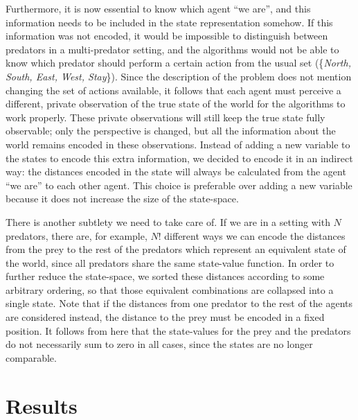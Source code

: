 \documentclass[a4paper,12pt]{article}
\begin{document}
Furthermore, it is now essential to know which agent ``we are'', and this information needs to be included in the state representation somehow. If this information was not encoded, it would be impossible to distinguish between predators in a multi-predator setting, and the algorithms would not be able to know which predator should perform a certain action from the usual set (\{\textit{North, South, East, West, Stay}\}). Since the description of the problem does not mention changing the set of actions available, it follows that each agent must perceive a different, private observation of the true state of the world for the algorithms to work properly. These private observations will still keep the true state fully observable; only the perspective is changed, but all the information about the world remains encoded in these observations. Instead of adding a new variable to the states to encode this extra information, we decided to encode it in an indirect way: the distances encoded in the state will always be calculated from the agent ``we are'' to each other agent. This choice is preferable over adding a new variable because it does not increase the size of the state-space.

There is another subtlety we need to take care of. If we are in a setting with $N$ predators, there are, for example, $N!$ different ways we can encode the distances from the prey to the rest of the predators which represent an equivalent state of the world, since all predators share the same state-value function. In order to further reduce the state-space, we sorted these distances according to some arbitrary ordering, so that those equivalent combinations are collapsed into a single state. Note that if the distances from one predator to the rest of the agents are considered instead, the distance to the prey must be encoded in a fixed position. It follows from here that the state-values for the prey and the predators do not necessarily sum to zero in all cases, since the states are no longer comparable.

\section{Results}
\end{document}

